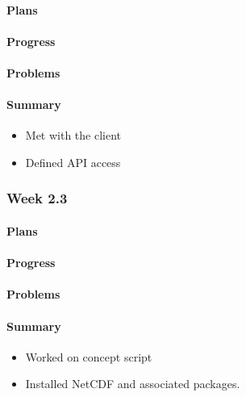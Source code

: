 \documentclass[onecolumn, draftclsnofoot,10pt, compsoc]{article}
\begin{document}
			\paragraph{Plans}
	
			\paragraph{Progress} \hfill \break

			\paragraph{Problems} \hfill \break

			\paragraph{Summary}\hfill \break
			    \begin{itemize}
                    \item Met with the client
                    \item Defined API access
                \end{itemize}
    
		\subsubsection{Week 2.3}
			\paragraph{Plans} \hfill \break

			\paragraph{Progress} \hfill \break

			\paragraph{Problems} \hfill \break

			\paragraph{Summary} \hfill \break
				\begin{itemize}
                    \item Worked on concept script 
                    \item Installed NetCDF and associated packages.
                \end{itemize}
    
\end{document}
